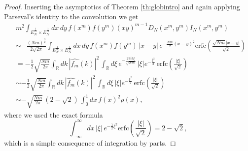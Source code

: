 \documentclass[11pt,reqno]{amsproc}
\numberwithin{equation}{section}
\numberwithin{theorem}{section}
\begin{document}
\begin{proof}
Inserting the asymptotics of Theorem \ref{th:globintro} and again applying Parseval's identity to the convolution we get
\begin{align}
&m^{2}\int_{E_{N}^{\frac{1}{m}}\times E_{N}^{\frac{1}{m}}}dx\,dy\,f(x^{m})f(y^{m})(xy)^{m-1}D_{N}(x^{m},y^{m})I_{N}(x^{m},y^{m})\\
&\sim -\frac{(Nm)^{\frac{3}{2}}}{2\sqrt{2\pi}}\int_{E_{N}^{\frac{1}{m}}\times E_{N}^{\frac{1}{m}}}dx\,dy\,f(x^{m})f(y^{m})\,|x-y|\,e^{-\frac{Nm}{2}(x-y)^{2}}
\mathrm{erfc}\left(\frac{\sqrt{Nm}|x-y|
}{\sqrt{2}}\right)\\
&= -\frac{1}{2}\sqrt{\frac{Nm}{2\pi}}\int_{\mathbb{R}}dk\,|\hat{f_{m}}(k)|^{2}\,\int_{\mathbb{R}}d\xi\,e^{-\frac{2\pi i k \xi}{\sqrt{Nm}}}\,|\xi|e^{-\frac{\xi^{2}}{2}}\,\mathrm{erfc}\left(\frac{|\xi|}{\sqrt{2}}\right) \\
&\sim -\frac{1}{2}\sqrt{\frac{Nm}{2\pi}}\int_{\mathbb{R}}dk\,|\hat{f_{m}}(k)|^{2}\,\int_{\mathbb{R}}d\xi\,|\xi|e^{-\frac{\xi^{2}}{2}}\,\mathrm{erfc}\left(\frac{|\xi|}{\sqrt{2}}\right) \label{parsednin}\\
&\sim -\sqrt{\frac{Nm}{2\pi}}\,(2-\sqrt{2})\,\int_{0}^{1}dx\,f(x)^{2}\rho(x), \label{finaldnin}
\end{align}
where we used the exact formula
\begin{equation}
\int_{-\infty}^{\infty}dx\,|\xi| \,e^{-\frac{1}{2}\xi^{2}}
\mathrm{erfc}\left(\frac{|\xi|
}{\sqrt{2}}\right) = 2-\sqrt{2},
\end{equation}
which is a simple consequence of integration by parts.
\end{proof}
\end{document}
